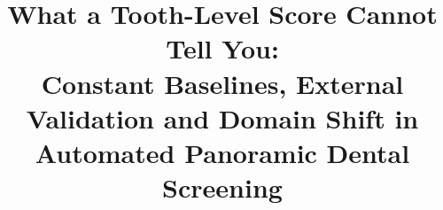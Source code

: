 \documentclass[conference]{IEEEtran}
\begin{document}
\title{What a Tooth-Level Score Cannot Tell You:\\
Constant Baselines, External Validation and Domain Shift
in Automated Panoramic Dental Screening}

\author{
}

\maketitle
\end{document}
